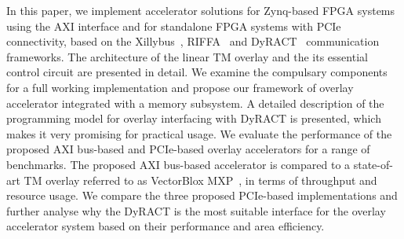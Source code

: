 In this paper, we implement accelerator solutions for Zynq-based FPGA systems using the AXI interface and for standalone FPGA systems with PCIe connectivity, based on the Xillybus~\cite{xillybus2018}, RIFFA~\cite{jacobsen2015riffa} and DyRACT~\cite{vipin2014dyract} communication frameworks. 
The architecture of the linear TM overlay and the its essential control circuit are presented in detail. 
We examine the compulsary components for a full working implementation and propose our framework of overlay accelerator integrated with a memory subsystem. 
A detailed description of the programming model for overlay interfacing with DyRACT is presented, which makes it very promising for practical usage. 
We evaluate the performance of the proposed AXI bus-based and PCIe-based overlay accelerators for a range of benchmarks. 
The proposed AXI bus-based accelerator is compared to a state-of-art TM overlay referred to as VectorBlox MXP~\cite{severance2013embedded}, in terms of throughput and resource usage. 
We compare the three proposed PCIe-based implementations and further analyse why the DyRACT is the most suitable interface for the overlay accelerator system  based on their performance and area efficiency. 


\begin{comment}
The main contributions can be summarized as follows:

\begin{itemize}
\item	
Examine memory interfaces for hardware accelerators implemented on FPGAs, and provide a comprehensive analysis of two of the state-of-the-art integration frameworks, i.e. Xillybus and RIFFA. 

\item
Propose complete hardware accelerator systems by integrating the linear TM overlays with Xillybus and RIFFA interfaces, respectively, and evaluate the throughput and resource usage of these hardware accelerators for a range of benchmarks.

\item
Make comparisons with a state-of-the-art TM overlay, namely VectorBlox MXP, which shows that the proposed overlay achieves approximately 50\% of the throughput, but uses just half of the bandwidth and less than 20\% hardware resource compared to MXP.

\end{itemize}
\end{comment}
